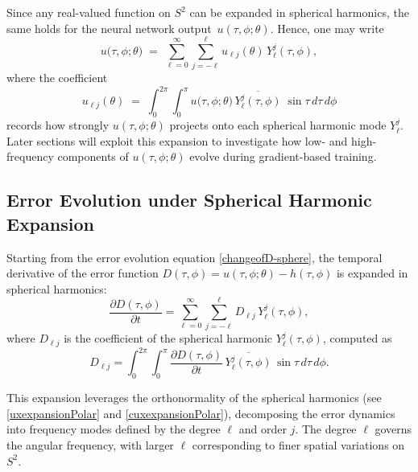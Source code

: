 \documentclass[review,onefignum,onetabnum,onealgnum]{siamart250106}
\numberwithin{theorem}{section}
\begin{document}
Since any real-valued function on \(S^2\) can be expanded in spherical harmonics, the same holds for the neural network output 
\(\,u(\tau,\phi;\theta)\).  Hence, one may write
\begin{equation}\label{uxthetaexpansionPolar}
u\bigl(\tau,\phi;\theta\bigr)
\;=\;
\sum_{\ell=0}^{\infty}
\sum_{j=-\ell}^{\ell}
u_{\ell j}(\theta)\,
Y_{\ell}^j(\tau,\phi),
\end{equation}
where the coefficient
\begin{equation}\label{cuxthetaexpansionPolar}
u_{\ell j}(\theta)
\;=\;
\int_{0}^{2\pi}\!\!\!\int_{0}^{\pi}
u\bigl(\tau,\phi;\theta\bigr)
\,\overline{Y_{\ell}^j(\tau,\phi)}
\;\sin\tau\,d\tau\,d\phi
\end{equation}
records how strongly \(u(\tau,\phi;\theta)\) projects onto each spherical harmonic mode \(Y_{\ell}^j\).  Later sections will exploit this expansion to investigate how low- and high-frequency components of \(u(\tau,\phi;\theta)\) evolve during gradient-based training.

\subsection{Error Evolution under Spherical Harmonic Expansion}
Starting from the error evolution equation \eqref{changeofD-sphere}, the temporal derivative of the error function \( D(\tau, \phi) = u(\tau, \phi; \theta) - h(\tau, \phi) \) is expanded in spherical harmonics:
\begin{equation}
    \frac{\partial D(\tau, \phi)}{\partial t} = \sum_{\ell=0}^{\infty} \sum_{j=-\ell}^{\ell} D_{\ell j} \, Y_{\ell}^j(\tau, \phi),
\end{equation}
where \( D_{\ell j} \) is the coefficient of the spherical harmonic \( Y_{\ell}^j(\tau, \phi) \), computed as
\begin{equation}
    D_{\ell j} = \int_{0}^{2\pi} \int_{0}^{\pi} \frac{\partial D(\tau, \phi)}{\partial t} \, \overline{Y_{\ell}^j(\tau, \phi)} \, \sin \tau \, d\tau \, d\phi.
\end{equation}

This expansion leverages the orthonormality of the spherical harmonics (see \eqref{uxexpansionPolar} and \eqref{cuxexpansionPolar}), decomposing the error dynamics into frequency modes defined by the degree \( \ell \) and order \( j \). The degree \( \ell \) governs the angular frequency, with larger \( \ell \) corresponding to finer spatial variations on \( S^2 \).

\end{document}
